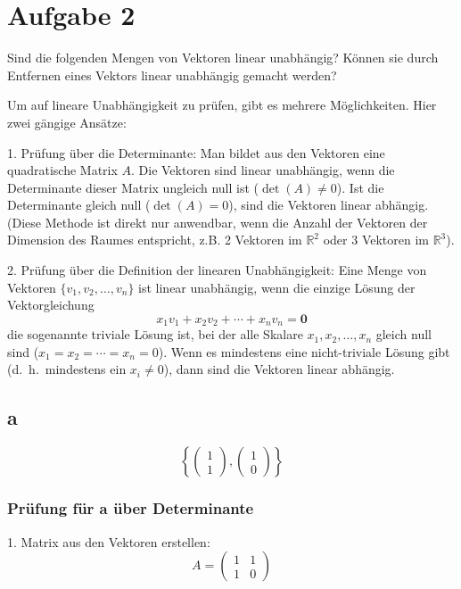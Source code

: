 \hrulefill{}

\section{Aufgabe 2}

Sind die folgenden Mengen von Vektoren linear unabhängig? Können sie durch
Entfernen eines Vektors linear unabhängig gemacht werden?

Um auf lineare Unabhängigkeit zu prüfen, gibt es mehrere Möglichkeiten. Hier
zwei gängige Ansätze:

1.  Prüfung über die Determinante:
Man bildet aus den Vektoren eine quadratische Matrix $A$. Die Vektoren sind linear unabhängig, wenn die Determinante dieser Matrix
ungleich null ist ($\det(A) \neq 0$). Ist die Determinante gleich null ($\det(A) = 0$), sind die Vektoren linear abhängig.
(Diese Methode ist direkt nur anwendbar, wenn die Anzahl der Vektoren der Dimension des Raumes entspricht, z.B. 2 Vektoren im $\mathbb{R}^2$ oder 3 Vektoren im $\mathbb{R}^3$).

2.  Prüfung über die Definition der linearen Unabhängigkeit:
Eine Menge von Vektoren $\{v_1, v_2, \dots, v_n\}$ ist linear unabhängig, wenn die einzige Lösung der Vektorgleichung
\[ x_1v_1 + x_2v_2 + \cdots + x_n v_n = \mathbf{0} \]
die sogenannte triviale Lösung ist, bei der alle Skalare $x_1, x_2, \dots, x_n$
gleich null sind ($x_1 = x_2 = \cdots = x_n = 0$). Wenn es mindestens eine
nicht-triviale Lösung gibt (d.\ h.\ mindestens ein $x_i \neq 0$), dann sind die
Vektoren linear abhängig.

\subsection{a}
\[ \left\{ \begin{pmatrix} 1 \\ 1 \end{pmatrix}, \begin{pmatrix} 1 \\ 0 \end{pmatrix} \right\} \]

\subsubsection*{Prüfung für a über Determinante}
1.  Matrix aus den Vektoren erstellen:
\[ A = \begin{pmatrix} 1 & 1 \\ 1 & 0 \end{pmatrix} \]

